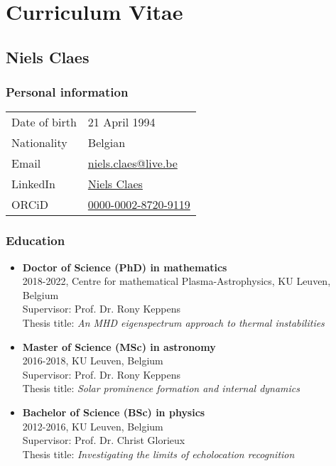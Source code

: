\chapter*{Curriculum Vitae}\label{ch: curriculum}

\vspace{-20pt}
\section*{Niels Claes}
\subsection*{Personal information}
\begin{tabular}[t]{ll}
  Date of birth & 21 April 1994  \\
  Nationality   & Belgian \\
  Email         & \href{mailto:niels.claes@live.be}{niels.claes@live.be} \\
  LinkedIn      & \href{https://www.linkedin.com/in/niels-claes-611140123/}{Niels Claes} \\
  ORCiD         & \href{https://orcid.org/0000-0002-8720-9119}{0000-0002-8720-9119}
\end{tabular}

\subsection*{Education}
\begin{itemize}
  \item[] \textbf{Doctor of Science (PhD) in mathematics} \hfill \\
  2018-2022, Centre for mathematical Plasma-Astrophysics, KU Leuven, Belgium \hfill \\
  Supervisor: Prof. Dr. Rony Keppens \hfill \\
  Thesis title: \emph{An MHD eigenspectrum approach to thermal instabilities}

  \item[] \textbf{Master of Science (MSc) in astronomy} \hfill \\
  2016-2018, KU Leuven, Belgium \hfill \\
  Supervisor: Prof. Dr. Rony Keppens \hfill \\
  Thesis title: \emph{Solar prominence formation and internal dynamics}

  \item[] \textbf{Bachelor of Science (BSc) in physics} \hfill \\
  2012-2016, KU Leuven, Belgium \hfill \\
  Supervisor: Prof. Dr. Christ Glorieux \hfill \\
  Thesis title: \emph{Investigating the limits of echolocation recognition}
\end{itemize}



